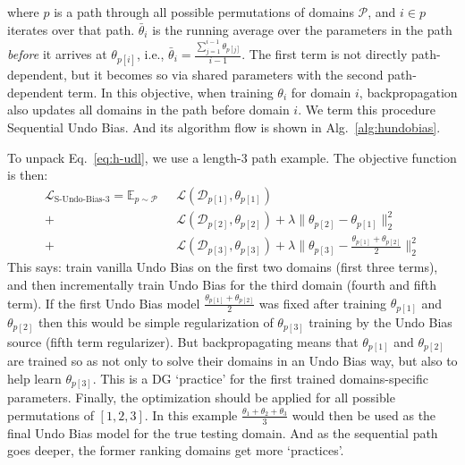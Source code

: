 \documentclass[runningheads]{llncs}
\newcommand{\hundo}{S-Undo-Bias}
\begin{document}
\noindent where $p$ is a path through all possible permutations of domains $\mathcal{P}$, and $i\in p$ iterates over that path. $\bar{\theta}_{i}$ is the running average over the parameters in the path \emph{before} it arrives at $\theta_{p[i]}$, i.e., $\bar{\theta}_{i}=\frac{\sum_{j=1}^{i-1}\theta_{p[j]}}{i-1}$. The first term is not directly path-dependent, but it becomes so via shared parameters with the second path-dependent term. In this objective, when training $\theta_i$ for domain $i$, backpropagation also updates all domains in the path before domain $i$. We term this procedure Sequential Undo Bias. And its algorithm flow is shown in Alg.~\ref{alg:hundobias}.

To unpack Eq.~\ref{eq:h-udl}, we use a length-3 path example. The objective function is then:
\small
\begin{equation}
\label{eq:h-udl-example}
\begin{aligned}
\mathcal{L}_{\text{\hundo{}-3}} = \mathbb{E}_{p\sim\mathcal{P}}~~~ & \mathcal{L}(\mathcal{D}_{p[1]}, \theta_{p[1]}) \\
+& \mathcal{L}(\mathcal{D}_{p[2]}, \theta_{p[2]}) + \lambda \| \theta_{p[2]} - \theta_{p[1]} \|_2^2  \\
+& \mathcal{L}(\mathcal{D}_{p[3]}, \theta_{p[3]}) + \lambda \| \theta_{p[3]} - \frac{\theta_{p[1]}+\theta_{p[2]}}{2} \|_2^2
\end{aligned}
\end{equation}\normalsize
This says: train vanilla Undo Bias on the first two domains (first three terms), and then incrementally train Undo Bias for the third domain (fourth and fifth term). If the first Undo Bias model $\frac{\theta_{p[1]}+\theta_{p[2]}}{2}$ was fixed after training $\theta_{p[1]}$ and $\theta_{p[2]}$ then this would be simple regularization of $\theta_{p[3]}$ training by the Undo Bias source (fifth term regularizer). But backpropagating means that $\theta_{p[1]}$ and $\theta_{p[2]}$ are trained so as not only to solve their domains in an Undo Bias way, but also to help learn $\theta_{p[3]}$. This is a DG `practice' for the first trained domains-specific parameters. Finally, the optimization should be applied for all possible permutations of $[1,2,3]$. In this example $\frac{\theta_1 + \theta_2 + \theta_3}{3}$ would then be used as the final Undo Bias model for the true testing domain. And as the sequential path goes deeper, the former ranking domains get more `practices'.
\end{document}
